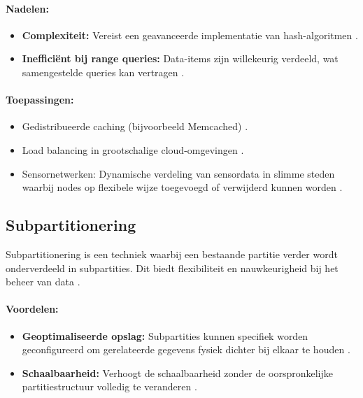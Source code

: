 \paragraph{Nadelen:}
\begin{itemize}
    \item \textbf{Complexiteit:} Vereist een geavanceerde implementatie van hash-algoritmen \autocite{Kleppmann2017}.
    \item \textbf{Inefficiënt bij range queries:} Data-items zijn willekeurig verdeeld, wat samengestelde queries kan vertragen \autocite{Mahmud2020}.
\end{itemize}

\paragraph{Toepassingen:}
\begin{itemize}
    \item Gedistribueerde caching (bijvoorbeeld Memcached) \autocite{Kleppmann2017}.
    \item Load balancing in grootschalige cloud-omgevingen \autocite{Kleppmann2017}.
    \item Sensornetwerken: Dynamische verdeling van sensordata in slimme steden waarbij nodes op flexibele wijze toegevoegd of verwijderd kunnen worden \autocite{Shi2016}.
\end{itemize}

\subsection{Subpartitionering}
Subpartitionering is een techniek waarbij een bestaande partitie verder wordt onderverdeeld in subpartities. Dit biedt flexibiliteit en nauwkeurigheid bij het beheer van data \autocite{Kleppmann2017}.

\paragraph{Voordelen:}
\begin{itemize}
    \item \textbf{Geoptimaliseerde opslag:} Subpartities kunnen specifiek worden geconfigureerd om gerelateerde gegevens fysiek dichter bij elkaar te houden \autocite{Kleppmann2017}.
    \item \textbf{Schaalbaarheid:} Verhoogt de schaalbaarheid zonder de oorspronkelijke partitiestructuur volledig te veranderen \autocite{TimescaleDBDocumentation}.
\end{itemize}

